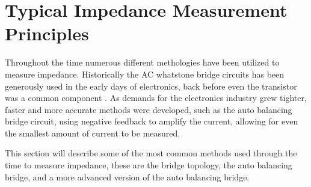 \section{Typical Impedance Measurement Principles} \label{sec:TypicalMeasPrin}
Throughout the time numerous different methologies have been utilized to measure impedance. Historically the AC whatstone bridge circuits has been generously used in the 
early days of electronics, back before even the transistor was a common component \cite{IET_LABS_LCR_PRINCIPLES}. As demands for the electronics industry grew tighter,
faster and more accurate methods were developed, such as the auto balancing bridge circuit, using negative feedback to amplify the current, allowing for even the
smallest amount of current to be measured.

This section will describe some of the most common methods used through the time to measure impedance, these are the bridge topology, the auto balancing bridge, and a more advanced version of the auto balancing bridge. 

